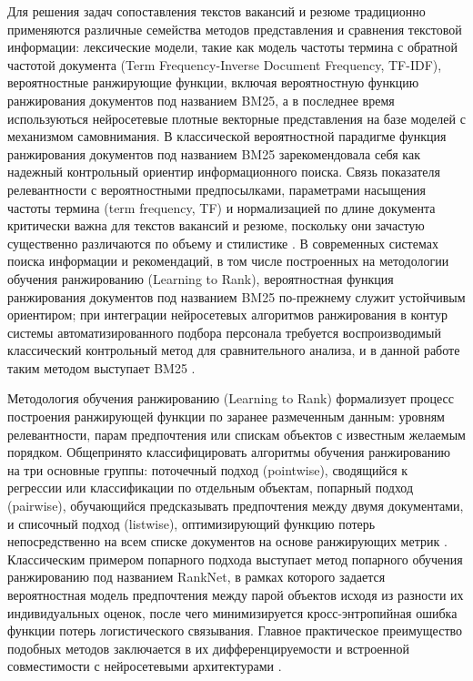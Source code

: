 Для решения задач сопоставления текстов вакансий и резюме традиционно применяются различные семейства методов представления и сравнения текстовой информации: лексические модели, такие как модель частоты термина с обратной частотой документа (Term Frequency-Inverse Document Frequency, TF-IDF), вероятностные ранжирующие функции, включая вероятностную функцию ранжирования документов под названием BM25, а в последнее время используються нейросетевые плотные векторные представления на базе моделей с механизмом самовнимания. В классической вероятностной парадигме функция ранжирования документов под названием BM25 зарекомендовала себя как надежный контрольный ориентир информационного поиска. Связь показателя релевантности с вероятностными предпосылками, параметрами насыщения частоты термина (term frequency, TF) и нормализацией по длине документа критически важна для текстов вакансий и резюме, поскольку они зачастую существенно различаются по объему и стилистике \cite{src11}. В современных системах поиска информации и рекомендаций, в том числе построенных на методологии обучения ранжированию (Learning to Rank), вероятностная функция ранжирования документов под названием BM25 по-прежнему служит устойчивым ориентиром; при интеграции нейросетевых алгоритмов ранжирования в контур системы автоматизированного подбора персонала требуется воспроизводимый классический контрольный метод для сравнительного анализа, и в данной работе таким методом выступает BM25 \cite{src08, src11}.

Методология обучения ранжированию (Learning to Rank) формализует процесс построения ранжирующей функции по заранее размеченным данным: уровням релевантности, парам предпочтения или спискам объектов с известным желаемым порядком. Общепринято классифицировать алгоритмы обучения ранжированию на три основные группы: поточечный подход (pointwise), сводящийся к регрессии или классификации по отдельным объектам, попарный подход (pairwise), обучающийся предсказывать предпочтения между двумя документами, и списочный подход (listwise), оптимизирующий функцию потерь непосредственно на всем списке документов на основе ранжирующих метрик \cite{src08}. Классическим примером попарного подхода выступает метод попарного обучения ранжированию под названием RankNet, в рамках которого задается вероятностная модель предпочтения между парой объектов исходя из разности их индивидуальных оценок, после чего минимизируется кросс-энтропийная ошибка функции потерь логистического связывания. Главное практическое преимущество подобных методов заключается в их дифференцируемости и встроенной совместимости с нейросетевыми архитектурами \cite{src09}.

